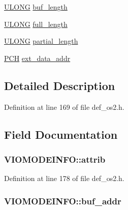 \begin{DoxyCompactItemize}
\item 
\hyperlink{def__os2_8h_af632da489ebc3708ec3ab6791ee53fa4}{U\+L\+O\+N\+G} \hyperlink{structVIOMODEINFO_adcd4fbbeeefb1d9b53b27fae50286c01}{buf\+\_\+length}
\item 
\hyperlink{def__os2_8h_af632da489ebc3708ec3ab6791ee53fa4}{U\+L\+O\+N\+G} \hyperlink{structVIOMODEINFO_ad233dc792e9ec6a2eea83c8526d6dde7}{full\+\_\+length}
\item 
\hyperlink{def__os2_8h_af632da489ebc3708ec3ab6791ee53fa4}{U\+L\+O\+N\+G} \hyperlink{structVIOMODEINFO_a594e87263b6d121f2c1aae05c0a0079a}{partial\+\_\+length}
\item 
\hyperlink{def__os2_8h_a2e9635a5523bbe0dd6e2014e89e4a986}{P\+C\+H} \hyperlink{structVIOMODEINFO_a09d7d0a8be4977f2339a4a02c143b019}{ext\+\_\+data\+\_\+addr}
\end{DoxyCompactItemize}


\subsection{Detailed Description}


Definition at line 169 of file def\+\_\+os2.\+h.



\subsection{Field Documentation}
\hypertarget{structVIOMODEINFO_a2815b90fcdb6ea1010ebea29641b6536}{
\subsubsection[{attrib}]{ V\+I\+O\+M\+O\+D\+E\+I\+N\+F\+O\+::attrib}}\label{structVIOMODEINFO_a2815b90fcdb6ea1010ebea29641b6536}


Definition at line 178 of file def\+\_\+os2.\+h.

\hypertarget{structVIOMODEINFO_a6e4510f2f1e4c50b764514c353b5134c}{
\subsubsection[{buf\+\_\+addr}]{ V\+I\+O\+M\+O\+D\+E\+I\+N\+F\+O\+::buf\+\_\+addr}}\label{structVIOMODEINFO_a6e4510f2f1e4c50b764514c353b5134c}


